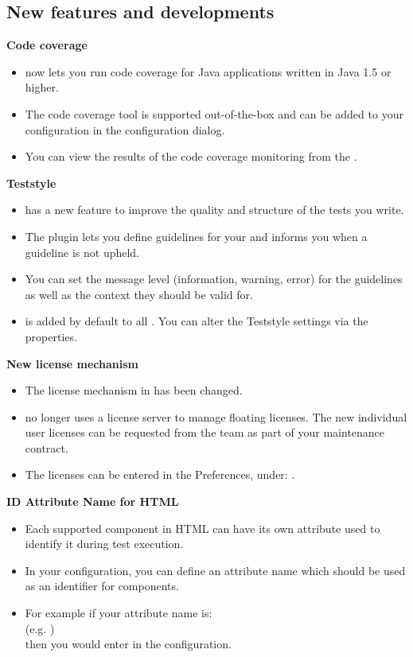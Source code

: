 \subsection{New features and developments}
\textbf{Code coverage}
\begin{itemize}
\item \app{} now lets you run code coverage for Java applications written in Java 1.5 or higher.
\item The code coverage tool  is supported out-of-the-box and can be added to your \gdaut{} configuration in the \gdaut{} configuration dialog. 
\item You can view the results of the code coverage monitoring from the \gdtestsummaryview{}. 
\end{itemize}

\textbf{Teststyle}
\begin{itemize}
\item \app{} has a new feature to improve the quality and structure of the tests you write.
\item The  plugin lets you define guidelines for your \gdproject{} and informs you when a guideline is not upheld. 
\item You can set the message level (information, warning, error) for the guidelines as well as the context they should be valid for.
\item {} is added by default to all \gdprojects{}. You can alter the Teststyle settings via the \gdproject{} properties.
\end{itemize}

\textbf{New license mechanism}
\begin{itemize}
\item The license mechanism in \app{} has been changed. 
\item \app{} no longer uses a license server to manage floating licenses. The new individual user licenses can be requested from the \app{} team as part of your maintenance contract. 
\item The licenses can be entered in the Preferences, under: .
\end{itemize}

\textbf{ID Attribute Name for HTML \gdauts{}}
\begin{itemize}
\item Each supported component in HTML \gdauts{} can have its own attribute used to identify it during test execution.
\item In your \gdaut{} configuration, you can define an attribute name which should be used as an identifier for components. 
\item For example if your attribute name is: 
  \\
(e.g. ) \\
then you would enter  in the \gdaut{} configuration. 
\end{itemize}


